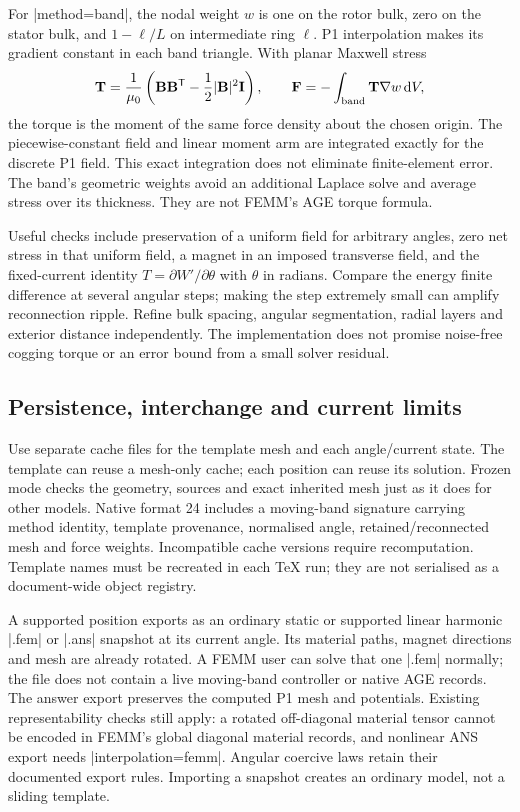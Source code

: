 For |method=band|, the nodal weight $w$ is one on the rotor bulk, zero on the
stator bulk, and $1-\ell/L$ on intermediate ring $\ell$. P1 interpolation makes
its gradient constant in each band triangle. With planar Maxwell stress
\[
 \mathbf T=\frac1{\mu_0}\left(\mathbf B\mathbf B^{\mathsf T}
             -\frac12|\mathbf B|^2\mathbf I\right),\qquad
 \mathbf F=-\int_{\rm band}\mathbf T\nabla w\,\mathrm dV,
\]
the torque is the moment of the same force density about the chosen origin.
The piecewise-constant field and linear moment arm are integrated exactly for
the discrete P1 field. This exact integration does not eliminate finite-element
error. The band's geometric weights avoid an additional Laplace solve and
average stress over its thickness. They are not FEMM's AGE torque formula.

Useful checks include preservation of a uniform field for arbitrary angles,
zero net stress in that uniform field, a magnet in an imposed transverse field,
and the fixed-current identity
$T=\partial W'/\partial\theta$ with $\theta$ in radians. Compare the energy
finite difference at several angular steps; making the step extremely small
can amplify reconnection ripple. Refine bulk spacing, angular segmentation,
radial layers and exterior distance independently. The implementation does not
promise noise-free cogging torque or an error bound from a small solver residual.

\subsection{Persistence, interchange and current limits}
Use separate cache files for the template mesh and each angle/current state.
The template can reuse a mesh-only cache; each position can reuse its solution.
Frozen mode checks the geometry, sources and exact inherited mesh just as it
does for other models. Native format 24 includes a moving-band signature carrying
method identity, template provenance, normalised angle, retained/reconnected
mesh and force weights. Incompatible cache versions require recomputation. Template names must be recreated in each TeX run; they are not
serialised as a document-wide object registry.

A supported position exports as an ordinary static or supported linear harmonic |.fem| or |.ans| snapshot
at its current angle. Its material paths, magnet directions and mesh are already
rotated. A FEMM user can solve that one |.fem| normally; the file does not contain
a live moving-band controller or native AGE records. The answer export preserves
the computed P1 mesh and potentials. Existing representability checks still
apply: a rotated off-diagonal material tensor cannot be encoded in FEMM's
global diagonal material records, and nonlinear ANS export needs
|interpolation=femm|. Angular coercive laws retain their documented export rules.
Importing a snapshot creates an ordinary model, not a sliding template.

